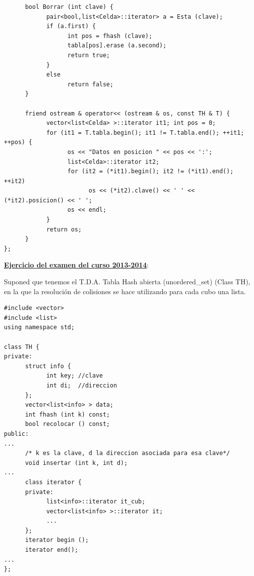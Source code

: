 \documentclass[10pt,a4paper,spanish]{report}
\begin{document}
\begin{verbatim}
      bool Borrar (int clave) {
            pair<bool,list<Celda>::iterator> a = Esta (clave);
            if (a.first) {
                  int pos = fhash (clave);
                  tabla[pos].erase (a.second);
                  return true;
            }
            else
                  return false;
      }

      friend ostream & operator<< (ostream & os, const TH & T) {
            vector<list<Celda> >::iterator it1; int pos = 0;
            for (it1 = T.tabla.begin(); it1 != T.tabla.end(); ++it1; ++pos) {
                  os << "Datos en posicion " << pos << ':';
                  list<Celda>::iterator it2;
                  for (it2 = (*it1).begin(); it2 != (*it1).end(); ++it2)
                        os << (*it2).clave() << ' ' << (*it2).posicion() << ' ';
                  os << endl;
            }
            return os;
      }
};
\end{verbatim}

\noindent
\textbf{\textcolor[rgb]{0.3,0.4,0.8}{\underline{Ejercicio del examen del curso 2013-2014}}}:

\noindent
Suponed que tenemos el T.D.A. Tabla Hash abierta (unordered\_set) (Class TH), en la que la resolución de colisiones se hace utilizando para cada cubo una lista.

\begin{verbatim}
#include <vector>
#include <list>
using namespace std;

class TH {
private:
      struct info {
            int key; //clave
            int di;  //direccion
      };
      vector<list<info> > data;
      int fhash (int k) const;
      bool recolocar () const;
public:
...
      /* k es la clave, d la direccion asociada para esa clave*/
      void insertar (int k, int d);
...
      class iterator {
      private:
            list<info>::iterator it_cub;
            vector<list<info> >::iterator it;
            ...
      };
      iterator begin ();
      iterator end();
...
};
\end{verbatim}
\end{document}
